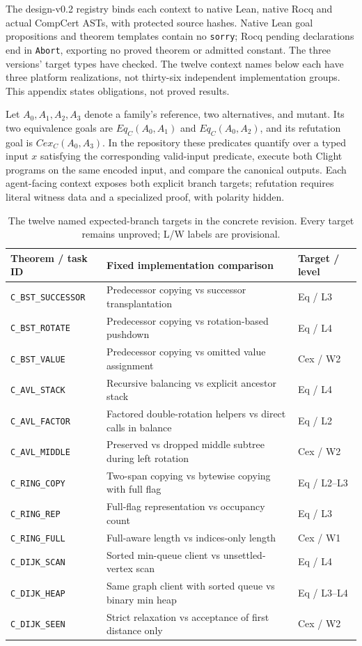 \documentclass{article}
\begin{document}
The design-v0.2 registry binds each context to native Lean, native Rocq and actual CompCert ASTs, with protected source hashes. Native Lean goal propositions and theorem templates contain no \texttt{sorry}; Rocq pending declarations end in \texttt{Abort}, exporting no proved theorem or admitted constant. The three versions' target types have checked. The twelve context names below each have three platform realizations, not thirty-six independent implementation groups. This appendix states obligations, not proved results.

Let $A_0,A_1,A_2,A_3$ denote a family's reference, two alternatives, and mutant. Its two equivalence goals are $\mathit{Eq}_C(A_0,A_1)$ and $\mathit{Eq}_C(A_0,A_2)$, and its refutation goal is $\mathit{Cex}_C(A_0,A_3)$. In the repository these predicates quantify over a typed input $x$ satisfying the corresponding valid-input predicate, execute both Clight programs on the same encoded input, and compare the canonical outputs. Each agent-facing context exposes both explicit branch targets; refutation requires literal witness data and a specialized proof, with polarity hidden.

\begin{table}[t]
\centering
\small
\caption{The twelve named expected-branch targets in the concrete revision. Every target remains unproved; L/W labels are provisional.}
\label{tab:targets}
\begin{tabular}{p{}p{}p{}}
\toprule
Theorem / task ID & Fixed implementation comparison & Target / level \\
\midrule
\texttt{C\_BST\_SUCCESSOR} & Predecessor copying vs successor transplantation & Eq / L3 \\
\texttt{C\_BST\_ROTATE} & Predecessor copying vs rotation-based pushdown & Eq / L4 \\
\texttt{C\_BST\_VALUE} & Predecessor copying vs omitted value assignment & Cex / W2 \\
\texttt{C\_AVL\_STACK} & Recursive balancing vs explicit ancestor stack & Eq / L4 \\
\texttt{C\_AVL\_FACTOR} & Factored double-rotation helpers vs direct calls in balance & Eq / L2 \\
\texttt{C\_AVL\_MIDDLE} & Preserved vs dropped middle subtree during left rotation & Cex / W2 \\
\texttt{C\_RING\_COPY} & Two-span copying vs bytewise copying with full flag & Eq / L2--L3 \\
\texttt{C\_RING\_REP} & Full-flag representation vs occupancy count & Eq / L3 \\
\texttt{C\_RING\_FULL} & Full-aware length vs indices-only length & Cex / W1 \\
\texttt{C\_DIJK\_SCAN} & Sorted min-queue client vs unsettled-vertex scan & Eq / L4 \\
\texttt{C\_DIJK\_HEAP} & Same graph client with sorted queue vs binary min heap & Eq / L3--L4 \\
\texttt{C\_DIJK\_SEEN} & Strict relaxation vs acceptance of first distance only & Cex / W2 \\
\bottomrule
\end{tabular}
\end{table}
\end{document}
